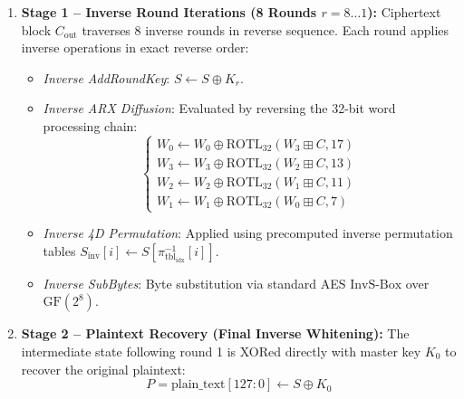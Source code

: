 \documentclass[10pt,twocolumn]{article}
\begin{document}
\begin{enumerate}
    \item \textbf{Stage 1 -- Inverse Round Iterations (8 Rounds $r = 8 \dots 1$):} Ciphertext block $C_{\text{out}}$ traverses 8 inverse rounds in reverse sequence. Each round applies inverse operations in exact reverse order:
    \begin{itemize}
        \item \emph{Inverse AddRoundKey}: $S \leftarrow S \oplus K_r$.
        \item \emph{Inverse ARX Diffusion}: Evaluated by reversing the 32-bit word processing chain:
        \begin{equation}
        \begin{cases}
            W_0 \leftarrow W_0 \oplus \text{ROTL}_{32}(W_3 \boxplus C, 17) \\
            W_3 \leftarrow W_3 \oplus \text{ROTL}_{32}(W_2 \boxplus C, 13) \\
            W_2 \leftarrow W_2 \oplus \text{ROTL}_{32}(W_1 \boxplus C, 11) \\
            W_1 \leftarrow W_1 \oplus \text{ROTL}_{32}(W_0 \boxplus C, 7)
        \end{cases}
        \end{equation}
        \item \emph{Inverse 4D Permutation}: Applied using precomputed inverse permutation tables $S_{\text{inv}}[i] \leftarrow S[\pi_{\text{tbl}_{\text{idx}}}^{-1}[i]]$.
        \item \emph{Inverse SubBytes}: Byte substitution via standard AES $\text{InvS-Box}$ over $\text{GF}(2^8)$.
    \end{itemize}
    
    \item \textbf{Stage 2 -- Plaintext Recovery (Final Inverse Whitening):} The intermediate state following round 1 is XORed directly with master key $K_0$ to recover the original plaintext:
    \begin{equation}
        P = \text{plain\_text}[127:0] \leftarrow S \oplus K_0
    \end{equation}
\end{enumerate}
\end{document}
